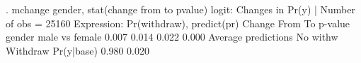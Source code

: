 . mchange gender, stat(change from to pvalue)
{\smallskip}
logit: Changes in Pr(y) | Number of obs = 25160
{\smallskip}
Expression: Pr(withdraw), predict(pr)
{\smallskip}
                {\VBAR}    Change       From         To    p-value 
gender          {\VBAR}                                            
 male vs female {\VBAR}     0.007      0.014      0.022      0.000 
{\smallskip}
Average predictions
{\smallskip}
             {\VBAR} No with{\tytilde}w   Withdraw 
  Pr(y|base) {\VBAR}     0.980      0.020 
{\smallskip}
{\smallskip}
